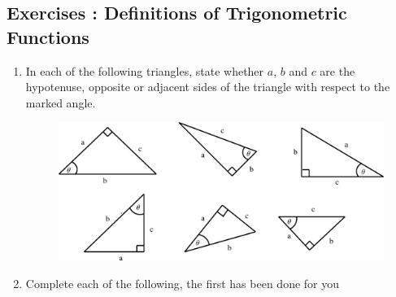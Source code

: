             \subsection{  Exercises : Definitions of Trigonometric Functions }
            \nopagebreak
      \label{m39408*id80155}\begin{enumerate}[noitemsep, label=\textbf{\arabic*}. ] 
            \label{m39408*uid22}\item In each of the following triangles, state whether $a$, $b$ and $c$ are the hypotenuse, opposite or adjacent sides of the triangle with respect to the marked angle.
    \setcounter{subfigure}{0}
	\begin{figure}[H] %
    \begin{center}
    \label{m39408*id80200!!!underscore!!!media}\label{m39408*id80200!!!underscore!!!printimage}\includegraphics{col11306.imgs/m39408_MG10C15_004.png} %
      \vspace{2pt}
    \vspace{.1in}
    \end{center}
 \end{figure}       \label{m39408*uid23}\item Complete each of the following, the first has been done for you
    \setcounter{subfigure}{0}
	\begin{figure}[H] %
    \begin{center}

\end{center}
\end{figure}
\end{enumerate}
